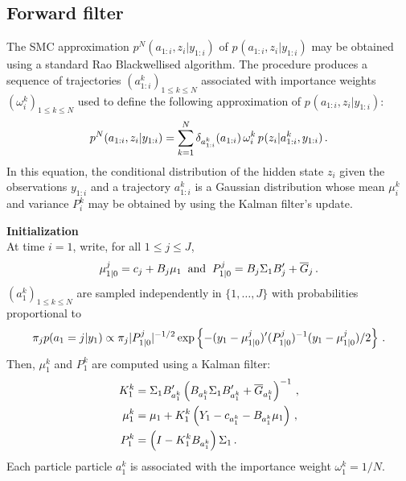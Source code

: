 \subsection{Forward filter}
\label{sec:forward}
The SMC approximation $p^N_{}(a_{1:i},z_{i}|y_{1:i})$ of $p_{}(a_{1:i},z_{i}|y_{1:i})$ may be obtained using a standard Rao Blackwellised  algorithm. The procedure produces a sequence of trajectories $(a^k_{1:i})_{1\le k \le N}$ associated with importance weights $(\omega^k_{i})_{1\le k \le N}$ used to define the following approximation of $p_{}(a_{1:i},z_{i}|y_{1:i})$:
\begin{equation}
\label{eq:forward:SMC}
p^N_{}(a_{1:i},z_{i}|y_{1:i}) = \sum_{k=1}^N\delta_{a^k_{1:i}}(a_{1:i})\,\omega^k_{i}\,p_{}(z_{i}|a^k_{1:i},y_{1:i})\,.
\end{equation}
In this equation, the conditional distribution of the hidden state $z_{i}$ given the observations $y_{1:i}$ and a trajectory $a^k_{1:i}$ is a Gaussian distribution whose mean $\mu^k_{i}$ and variance $P^k_{i}$ may be obtained by using the Kalman filter's update.

\vspace{.2cm}

\noindent\textbf{Initialization}\\
At time $i=1$, write, for all $1\le j \le J$,
\[
\mu^j_{1|0} = c_{j}+B_{j}\mu_1\;\;\mbox{and}\;\;P_{1|0}^j =B_{j}\Sigma_1B'_{j} + \overline{G}_{j}\,.
\]
$(a^k_1)_{1\le k \le N}$ are sampled independently in $\{1,\ldots,J\}$ with probabilities proportional to
\[
\pi_j p(a_1=j|y_1) \propto \pi_j |P_{1|0}^j|^{-1/2}\exp\left\{-(y_1-\mu^j_{1|0})'(P_{1|0}^j)^{-1}(y_1-\mu^j_{1|0})/2\right\}\,.
\]
Then, $\mu_1^k$ and $P_1^k$ are computed using a Kalman filter:
\begin{align*}
K^k_{1} &=\Sigma_1B'_{a_1^k}\left(B_{a_1^k}\Sigma_1B'_{a_1^k} + \overline{G}_{a_1^k}\right)^{-1}\,,\\
\mu^k_{1} &= \mu_{1} + K^k_1\left(Y_1 - c_{a_{1}^k} - B_{a_1^k}\mu_{1}\right)\,,\\
P^k_{1} &=\left(I-K^k_{1}B_{a_1^k}\right)\Sigma_1\,.
\end{align*}
Each particle particle $a_1^k$ is associated with the importance weight $\omega^k_1 = 1/N$.

\vspace{.2cm}

